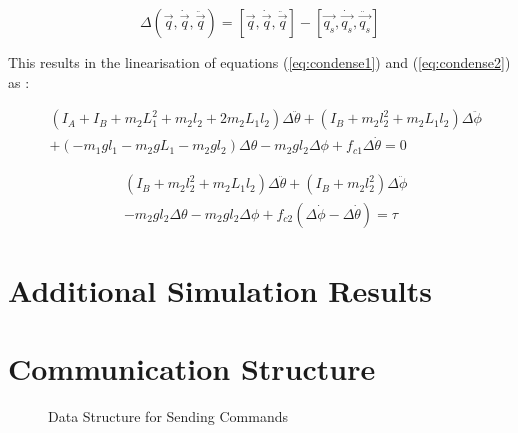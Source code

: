 \begin{equation}
\label{eq:workingpoint}
\Delta( \vec{q}, \dot{ \vec{q} }, \ddot{ \vec{q} }) =  [\vec{q}, \dot{ \vec{q} }, \ddot{ \vec{q} }] - [\vec{q_{s}},\dot{\vec{q_{s}}},\ddot{\vec{q_{s}}}]
\end{equation}

This results in the linearisation of equations (\ref{eq:condense1}) and (\ref{eq:condense2}) as :

\begin{equation}
\begin{split}
&(I_{A} + I_{B} + m_{2}L_{1}^2+m_{2}l_{2}+2m_{2}L_{1}l_{2})\Delta\ddot{\theta} + (I_{B}+m_{2}l_{2}^2+m_{2}L_{1}l_{2})\Delta\ddot{\phi}\\
&+(-m_{1}gl_{1}-m_{2}gL_{1}-m_{2}gl_{2})\Delta\theta -m_{2}gl_{2}\Delta\phi + f_{c1}\Delta\dot{\theta} = 0
\end{split}
\end{equation}

\begin{equation}
\begin{split}
&(I_{B}+m_{2}l_{2}^2+m_{2}L_{1}l_{2})\Delta\ddot{\theta} + (I_{B}+m_{2}l_{2}^2)\Delta\ddot{\phi}\\
& -m_{2}gl_{2}\Delta\theta -m_{2}gl_{2}\Delta\phi +f_{c2}(\Delta\dot{\phi}-\Delta\dot{\theta}) = \tau
\end{split}
\end{equation}

\section{Additional Simulation Results}
\label{app:simulation_results}

















\section{Communication Structure}
\label{sec:software_requirements}
\begin{figure}[h]
	\centering
	
	\caption{Data Structure for Sending Commands}
	\label{fig:uart_struct_app}
\end{figure}

